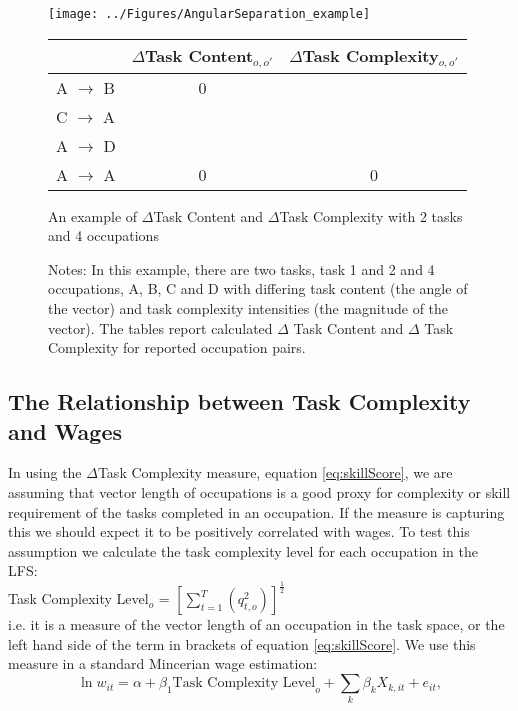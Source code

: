 \documentclass[12pt,authoryear]{elsarticle}
\begin{document}
	\begin{figure}[H]
		\centering
		\texttt{[image: ../Figures/AngularSeparation\_example]}
		\qquad
		\begin{tabular}{lcc}
			& $\Delta$Task Content$ _{o,o'}$& $\Delta$Task Complexity$_{o,o'}$\\
			\hline
			\hline
			A $\rightarrow$ B & 0 &   \\
			C $\rightarrow$ A &   &   \\
			A $\rightarrow$ D &   &   \\
			A $\rightarrow$ A & 0 & 0 \\
		\end{tabular}
		\caption{An example of $\Delta$Task Content  and $\Delta$Task Complexity with 2 tasks and 4 occupations}
		\caption*{\footnotesize{Notes: In this example, there are two tasks, task 1 and 2 and 4 occupations, A, B, C and D with differing task content (the angle of the vector) and task complexity intensities (the magnitude of the vector). The tables report calculated $\Delta$ Task Content and $\Delta$ Task Complexity for reported occupation pairs.}}
		\label{fig:AngSep}
	\end{figure}
	

	
	
	
		\subsection{The Relationship between Task Complexity and Wages}
	\label{sec:wagesSkills}
	In using the $\Delta$Task Complexity measure, equation \ref{eq:skillScore}, we are assuming that vector length of occupations is a good proxy for complexity or skill requirement of the tasks completed in an occupation. If the measure is capturing this we should expect it to be positively correlated with wages. To test this assumption we calculate the task complexity level for each occupation in the LFS: \\
	
	Task Complexity Level$_{o}$ = $\left[\sum_{t=1}^{T}(q_{t,o}^{2})\right]^{\frac{1}{2}} $ \\
	
	\noindent  i.e. it is a measure of the vector length of an occupation in the task space, or the left hand side of the term in brackets of equation \ref{eq:skillScore}. We use this measure in a standard Mincerian wage estimation: 
	\begin{equation}
		\label{eq:skill_returns}
		\ln w_{it}= \alpha + \beta_{1}\text{Task Complexity Level}_{o}+  \sum_{k} \beta_{k}X_{k,it} + e_{it}, 
	\end{equation}
	
\end{document}

